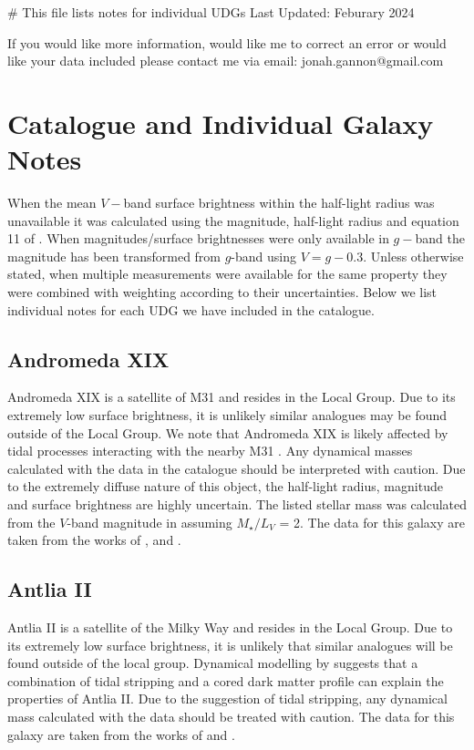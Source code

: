 # This file lists notes for individual UDGs 
Last Updated: Feburary 2024

If you would like more information, would like me to correct an error or would like your data included please contact me via email:
jonah.gannon@gmail.com

\section{Catalogue and Individual Galaxy Notes} \label{sec:catalogue}
When the mean $V-$band surface brightness within the half-light radius was unavailable it was calculated using the magnitude, half-light radius and equation 11 of \citet{Graham2005}.  When magnitudes/surface brightnesses were only available in $g-$band the magnitude has been transformed from $g$-band using $V=g-0.3$. Unless otherwise stated, when multiple measurements were available for the same property they were combined with weighting according to their uncertainties. Below we list individual notes for each UDG we have included in the catalogue.

\subsection{Andromeda XIX}
Andromeda XIX is a satellite of M31 and resides in the Local Group. Due to its extremely low surface brightness, it is unlikely similar analogues may be found outside of the Local Group. We note that Andromeda XIX is likely affected by tidal processes interacting with the nearby M31 \citep{Collins2020, Collins2022}. Any dynamical masses calculated with the data in the catalogue should be interpreted with caution. Due to the extremely diffuse nature of this object, the half-light radius, magnitude and surface brightness are highly uncertain. The listed stellar mass was calculated from the $V$-band magnitude in \citet{Martin2016} assuming $M_{\star}/L_{V}$ = 2. The data for this galaxy are taken from the works of \citet{Martin2016}, \citet{Collins2020} and \citet{Gannon2021}.

\subsection{Antlia II}
Antlia II is a satellite of the Milky Way and resides in the Local Group. Due to its extremely low surface brightness, it is unlikely that similar analogues will be found outside of the local group. Dynamical modelling by \citet{torrealba2019} suggests that a combination of tidal stripping and a cored dark matter profile can explain the properties of Antlia II. Due to the suggestion of tidal stripping, any dynamical mass calculated with the data should be treated with caution. The data for this galaxy are taken from the works of \citet{mcconnachie2012} and \citet{torrealba2019}.

